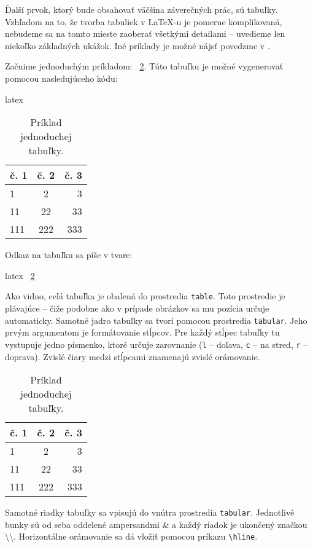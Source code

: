 Ďalší prvok, ktorý bude obsahovať väčšina záverečných prác, sú tabuľky. Vzhľadom na to, že tvorba tabuliek v LaTeX-u je pomerne komplikovaná, nebudeme sa na tomto mieste zaoberať všetkými detailami -- uvedieme len niekoľko základných ukážok. Iné príklady je možné nájsť povedzme v \cite{latexTables}.

Začnime jednoduchým príkladom: \tablename~\ref{tab:priklad}. Túto tabuľku je možné vygenerovať pomocou nasledujúceho kódu:
\begin{inlinecode}{latex}
\begin{table}
\centering
\caption{Príklad jednoduchej tabuľky.}
\label{tab:priklad}
\begin{tabular}{|l|c|r|}
\hline
\textbf{č. 1} & \textbf{č. 2} &  \textbf{č. 3} \\
\hline
1 & 2 & 3 \\
11 & 22 & 33 \\
111 & 222 & 333 \\
\hline
\end{tabular}
\end{table}
\end{inlinecode}
Odkaz na tabuľku sa píše v tvare:
\begin{inlinecode}{latex}
\tablename~\ref{tab:priklad}
\end{inlinecode}

Ako vidno, celá tabuľka je obalená do prostredia \texttt{table}. Toto prostredie je plávajúce -- čiže podobne ako v prípade obrázkov sa mu pozícia určuje automaticky. Samotné jadro tabuľky sa tvorí pomocou prostredia \texttt{tabular}. Jeho prvým argumentom je formátovanie stĺpcov. Pre každý stĺpec tabuľky tu vystupuje jedno písmenko, ktoré určuje zarovnanie (\texttt{l} -- doľava, \texttt{c} -- na stred, \texttt{r} -- doprava). Zvislé čiary medzi stĺpcami znamenajú zvislé orámovanie.

\begin{table}
\centering
\caption{Príklad jednoduchej tabuľky.}
\label{tab:priklad}
\begin{tabular}{|l|c|r|}
\hline
\textbf{č. 1} & \textbf{č. 2} &  \textbf{č. 3} \\
\hline
1 & 2 & 3 \\
11 & 22 & 33 \\
111 & 222 & 333 \\
\hline
\end{tabular}
\end{table}

Samotné riadky tabuľky sa vpisujú do vnútra prostredia \texttt{tabular}. Jednotlivé bunky sú od seba oddelené ampersandmi \& a každý riadok je ukončený značkou \textbackslash\textbackslash. Horizontálne orámovanie sa dá vložiť pomocou príkazu \texttt{{\textbackslash}hline}.

